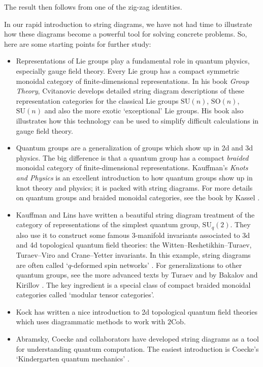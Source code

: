 \documentclass[12pt,twoside,openright]{report}
\newcommand{\Cob}{\mathrm{Cob}}
\begin{document}
The result then follows from one of the zig-zag identities.  

In our rapid introduction to string diagrams, we have not had time to illustrate how these diagrams become a powerful tool for solving concrete problems.  So, here are some starting points for further study:

\begin{itemize}
\item Representations of Lie groups play a fundamental role in quantum physics, especially gauge field theory. Every Lie group has a compact symmetric monoidal category of finite-dimensional representations.  In his book
{\sl Group Theory}, Cvitanovic \cite{Cvitanovic} develops detailed string diagram descriptions of these representation categories for the classical Lie groups 
$\mathrm{SU}(n)$, $\mathrm{SO}(n)$, $\mathrm{SU}(n)$ and also the more exotic `exceptional' Lie groups. His book also illustrates how this technology can be used to simplify difficult calculations in gauge field theory.
\item Quantum groups are a generalization of groups which show up in 2d and 3d physics.  The big difference is that a quantum group has a compact {\em braided} monoidal category of finite-dimensional representations.  Kauffman's {\sl Knots and Physics} \cite{Kauffman} 
is an excellent introduction to how quantum groups show up in knot theory and physics; it is packed with string diagrams. For more details on quantum groups and braided monoidal categories, see the book by Kassel \cite{Kassel}.
\item Kauffman and Lins \cite{KaufmanLins} have written a beautiful string diagram treatment of the category of representations of the simplest quantum group, $\mbox{SU}_q(2)$.  They also use it to construct some famous 
3-manifold invariants associated to 3d and 4d topological quantum field theories: the Witten--Reshetikhin--Turaev, Turaev--Viro and Crane--Yetter invariants.  In this example, string diagrams are often called 
`$q$-deformed spin networks' \cite{Smolin}.  For generalizations to other quantum groups, see the more advanced texts by Turaev 
\cite{Turaev} and by Bakalov and Kirillov \cite{BK}. The key ingredient is a special class of compact braided monoidal categories called `modular tensor categories'.
\item Kock \cite{Kock04} has written a nice introduction to 2d topological quantum field theories which uses diagrammatic methods to work with $2\Cob$.
\item Abramsky, Coecke and collaborators \cite{Abramsky,AC,AD,Coecke1, CP1,CP2} have developed string diagrams as a tool for understanding quantum computation.  The easiest introduction is Coecke's 
`Kindergarten quantum mechanics' \cite{Coecke2}.
\end{itemize}
\end{document}
